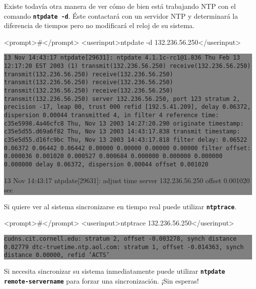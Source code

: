 	
	
	

Existe todavía otra manera de ver cómo de bien está trabajando NTP con 
el comando \texttt{\textbf{ntpdate -d}}. Éste contactará con un servidor NTP y
determinará la diferencia de tiempos pero no modificará el reloj de su sistema.



<prompt>#</prompt> <userinput>ntpdate -d 132.236.56.250</userinput>
\colorbox{grey}{\parbox[t]{0.95\linewidth}{ \vspace*{0.5cm} {\tt 13 Nov 14:43:17 ntpdate[29631]: ntpdate 4.1.1c-rc1@1.836 Thu Feb 13 12:17:20 EST 2003 (1)
transmit(132.236.56.250)
receive(132.236.56.250)
transmit(132.236.56.250)
receive(132.236.56.250)
transmit(132.236.56.250)
receive(132.236.56.250)
transmit(132.236.56.250)
receive(132.236.56.250)
transmit(132.236.56.250)
server 132.236.56.250, port 123
stratum 2, precision -17, leap 00, trust 000
refid [192.5.41.209], delay 0.06372, dispersion 0.00044
transmitted 4, in filter 4
reference time:    c35e5998.4a46cfc8  Thu, Nov 13 2003 14:27:20.290
originate timestamp: c35e5d55.d69a6f82  Thu, Nov 13 2003 14:43:17.838
transmit timestamp:  c35e5d55.d16fc9bc  Thu, Nov 13 2003 14:43:17.818
filter delay:  0.06522  0.06372  0.06442  0.06442
         0.00000  0.00000  0.00000  0.00000
filter offset: 0.000036 0.001020 0.000527 0.000684
         0.000000 0.000000 0.000000 0.000000
delay 0.06372, dispersion 0.00044
offset 0.001020

13 Nov 14:43:17 ntpdate[29631]: adjust time server 132.236.56.250 offset 0.001020 sec
 } \vspace*{0.5cm} } } 

	

	
Si quiere ver al sistema sincronizarse en tiempo real puede utilizar 
\texttt{\textbf{ntptrace}}.


<prompt>#</prompt> <userinput>ntptrace 132.236.56.250</userinput>
\colorbox{grey}{\parbox[t]{0.95\linewidth}{ \vspace*{0.5cm} {\tt cudns.cit.cornell.edu: stratum 2, offset -0.003278, synch distance 0.02779
dtc-truetime.ntp.aol.com: stratum 1, offset -0.014363, synch distance 0.00000, refid 'ACTS' } \vspace*{0.5cm} } } 

	

	
	
Si necesita sincronizar su sistema inmediatamente puede utilizar
\texttt{\textbf{ntpdate remote-servername}} para forzar una sincronización. ¡Sin esperas!


